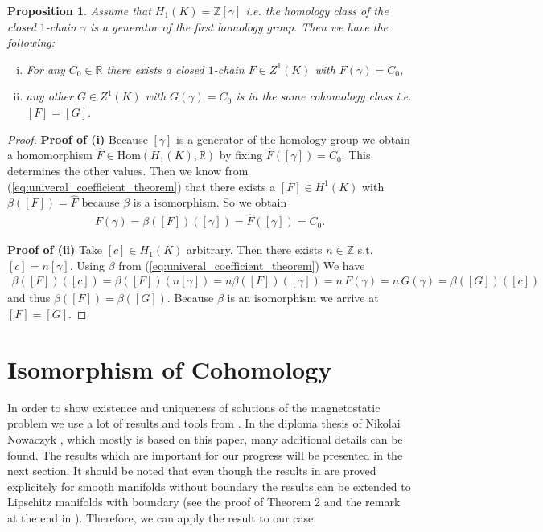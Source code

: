 \documentclass[12pt,a4paper]{article}
\numberwithin{equation}{subsection}
\numberwithin{lemma}{subsection}
\newtheorem{proposition}[lemma]{Proposition}
\theoremstyle{definition}
\newcommand{\integers}{\mathbb{Z}}
\newcommand{\real}{\mathbb{R}}
\begin{document}
\begin{proposition}\label{prop:uniqueness_cochain}
    Assume that $H_1(K) = \integers [\gamma]$ i.e. the homology class of the 
    closed $1$-chain $\gamma$ is a generator of the first homology group.
    Then we have the following:
    \begin{enumerate}[(i)]
        \item For any $C_0 \in \real$ there exists a closed $1$-chain 
            $F \in Z^1(K)$ with $F(\gamma) = C_0$,
        \item any other $G \in Z^1(K)$ with $G(\gamma) = C_0$ 
            is in the same cohomology class i.e. $[F] = [G]$.
    \end{enumerate}
\end{proposition}
\begin{proof}
    \textbf{Proof of (i)} %
    Because $[\gamma]$ is a generator of the homology group we  obtain a 
    homomorphism $\hat{F} \in \text{Hom}(H_1(K),\real)$ by fixing
    $\hat{F}([\gamma]) = C_0$. This determines the other values.
    Then we know from (\ref{eq:univeral_coefficient_theorem}) that there exists
    a $[F] \in H^1(K)$ with $\beta([F]) = \hat{F}$ because $\beta$ is a 
    isomorphism. So we obtain
    \begin{align*}
        F(\gamma) = \beta([F])([\gamma]) = \hat{F}([\gamma]) = C_0.
    \end{align*}

    \textbf{Proof of (ii)} %
    Take $[c] \in H_1(K)$ arbitrary. Then there exists  $n \in \integers$ s.t.
    $[c] = n [\gamma]$.
    Using $\beta$ from (\ref{eq:univeral_coefficient_theorem})
    We have
    \begin{align*}
        \beta([F])([c]) = \beta([F])(n [\gamma]) 
        = n \beta([F])([\gamma]) = n \, F(\gamma) = n \, G(\gamma) = 
        \beta([G])([c])
    \end{align*}
    and thus $\beta([F]) = \beta([G])$. Because $\beta$ is an isomorphism
    we arrive at $[F] = [G]$.
\end{proof}


\section{Isomorphism of Cohomology}

In order to show existence and uniqueness of solutions of the magnetostatic 
problem we use a lot of results and tools from \cite{goldshtein}. 
In the diploma thesis of Nikolai
Nowaczyk \cite{nowaczyk}, which mostly is based on this paper, 
many additional details can be found. The results which are important for 
our progress will be presented in the
next section. It should be noted that even though the results in 
\cite{goldshtein} are
proved explicitely for smooth manifolds without boundary the results can be 
extended to Lipschitz manifolds with boundary (see the proof of Theorem 2 and 
the remark at the end in \cite{goldshtein}). Therefore, we can apply the result
to our case.
\end{document}
